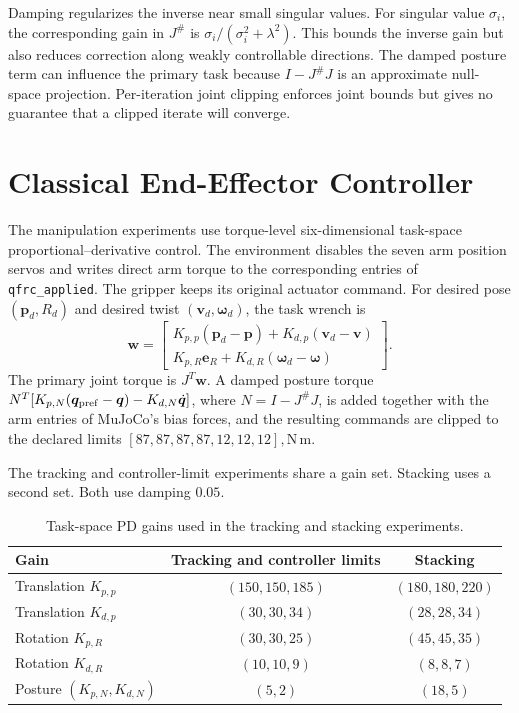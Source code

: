 \documentclass[12pt,a4paper]{article}
\begin{document}
Damping regularizes the inverse near small singular values. For singular value $\sigma_i$, the corresponding gain in $J^{\#}$ is $\sigma_i/(\sigma_i^2+\lambda^2)$. This bounds the inverse gain but also reduces correction along weakly controllable directions. The damped posture term can influence the primary task because $I-J^{\#}J$ is an approximate null-space projection. Per-iteration joint clipping enforces joint bounds but gives no guarantee that a clipped iterate will converge.

\section{Classical End-Effector Controller}
The manipulation experiments use torque-level six-dimensional task-space proportional--derivative control. The environment disables the seven arm position servos and writes direct arm torque to the corresponding entries of \texttt{qfrc\_applied}. The gripper keeps its original actuator command. For desired pose $(\bm p_d,R_d)$ and desired twist $(\bm v_d,\bm\omega_d)$, the task wrench is
\begin{equation}
\bm w =
\begin{bmatrix}
K_{p,p}(\bm p_d-\bm p)+K_{d,p}(\bm v_d-\bm v)\\
K_{p,R}\bm e_R+K_{d,R}(\bm\omega_d-\bm\omega)
\end{bmatrix}.
\end{equation}
The primary joint torque is $J^T\bm w$. A damped posture torque $N^T[K_{p,N}(\bm q_{\rm pref}-\bm q)-K_{d,N}\dot{\bm q}]$, where $N=I-J^{\#}J$, is added together with the arm entries of MuJoCo's bias forces, and the resulting commands are clipped to the declared limits $[87,87,87,87,12,12,12],\mathrm{N\,m}$.


The tracking and controller-limit experiments share a gain set. Stacking uses a second set. Both use damping $0.05$.

\begin{table}[!htbp]
\centering\small
\caption{Task-space PD gains used in the tracking and stacking experiments.}
\begin{tabular}{lcc}
\toprule
Gain & Tracking and controller limits & Stacking\\
\midrule
Translation $K_{p,p}$ & $(150,150,185)$ & $(180,180,220)$\\
Translation $K_{d,p}$ & $(30,30,34)$ & $(28,28,34)$\\
Rotation $K_{p,R}$ & $(30,30,25)$ & $(45,45,35)$\\
Rotation $K_{d,R}$ & $(10,10,9)$ & $(8,8,7)$\\
Posture $(K_{p,N},K_{d,N})$ & $(5,2)$ & $(18,5)$\\
\bottomrule
\end{tabular}
\end{table}
\end{document}
